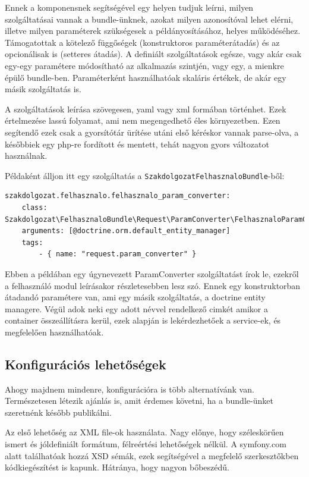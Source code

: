 \documentclass[a4paper,12pt,oneside]{report}
\begin{document}
Ennek a komponensnek segítségével egy helyen tudjuk leírni, milyen szolgáltatásai vannak a bundle-ünknek, azokat milyen azonosítóval lehet elérni, illetve milyen paraméterek szükségesek a példányosításához, helyes működéséhez. Támogatottak a kötelező függőségek (konstruktoros paraméterátadás) és az opcionálisak is (setteres átadás). A definiált szolgáltatások egésze, vagy akár csak egy-egy paramétere módosítható az alkalmazás szintjén, vagy egy, a mienkre épülő bundle-ben. Paraméterként használhatóak skaláris értékek, de akár egy másik szolgáltatás is.

A szolgáltatások leírása szövegesen, yaml vagy xml formában történhet. Ezek értelmezése lassú folyamat, ami nem megengedhető éles környezetben. Ezen segítendő ezek csak a gyorsítótár ürítése utáni első kéréskor vannak parse-olva, a későbbiek egy php-re fordított és mentett, tehát nagyon gyors változatot használnak.

Példaként álljon itt egy szolgáltatás a \texttt{SzakdolgozatFelhasznaloBundle}-ből:

\begin{lstlisting}[]
szakdolgozat.felhasznalo.felhasznalo_param_converter:
    class: Szakdolgozat\FelhasznaloBundle\Request\ParamConverter\FelhasznaloParamConverter
    arguments: [@doctrine.orm.default_entity_manager]
    tags:
        - { name: "request.param_converter" }
\end{lstlisting}

Ebben a példában egy úgynevezett ParamConverter szolgáltatást írok le, ezekről a felhasználó modul leírásakor részletesebben lesz szó. Ennek egy konstruktorban átadandó paramétere van, ami egy másik szolgáltatás, a doctrine entity managere. Végül adok neki egy adott névvel rendelkező cimkét \textendash{} amikor a container összeállításra kerül, ezek alapján is lekérdezhetőek a service-ek, és megfelelően használhatóak.

\subsection*{Konfigurációs lehetőségek}

Ahogy majdnem mindenre, konfigurációra is több alternatívánk van. Természetesen létezik ajánlás is, amit érdemes követni, ha a bundle-ünket szeretnénk később publikálni.

Az első lehetőség az XML file-ok használata. Nagy előnye, hogy széleskörűen ismert és jóldefiniált formátum, félreértési lehetőségek nélkül. A symfony.com alatt találhatóak hozzá XSD sémák, ezek segítségével a megfelelő szerkesztőkben kódkiegészítést is kapunk. Hátránya, hogy nagyon bőbeszédű.
\end{document}
